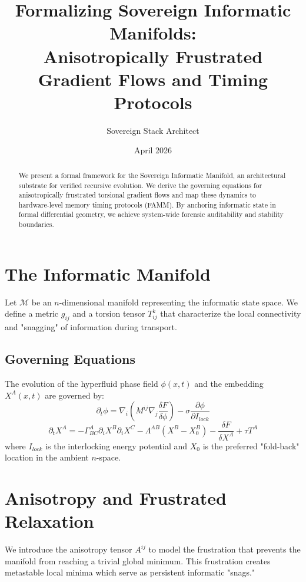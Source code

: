 \documentclass[11pt,a4paper]{article}
\title{Formalizing Sovereign Informatic Manifolds: \\ Anisotropically Frustrated Gradient Flows and Timing Protocols}
\author{Sovereign Stack Architect}
\date{April 2026}
\begin{document}
\maketitle

\begin{abstract}
We present a formal framework for the Sovereign Informatic Manifold, an architectural substrate for verified recursive evolution. We derive the governing equations for anisotropically frustrated torsional gradient flows and map these dynamics to hardware-level memory timing protocols (FAMM). By anchoring informatic state in formal differential geometry, we achieve system-wide forensic auditability and stability boundaries.
\end{abstract}

\section{The Informatic Manifold}
Let $\mathcal{M}$ be an $n$-dimensional manifold representing the informatic state space. We define a metric $g_{ij}$ and a torsion tensor $T^k_{ij}$ that characterize the local connectivity and "snagging" of information during transport.

\subsection{Governing Equations}
The evolution of the hyperfluid phase field $\phi(x,t)$ and the embedding $X^A(x,t)$ are governed by:
\begin{equation}
    \partial_t \phi = \nabla_i(M^{ij} \nabla_j \frac{\delta F}{\delta \phi}) - \sigma \frac{\partial \phi}{\partial I_{lock}}
\end{equation}
\begin{equation}
    \partial_t X^A = -\Gamma^A_{BC} \partial_i X^B \partial_i X^C - \Lambda^{AB}(X^B - X_0^B) - \frac{\delta F}{\delta X^A} + \tau T^A
\end{equation}
where $I_{lock}$ is the interlocking energy potential and $X_0$ is the preferred "fold-back" location in the ambient $n$-space.

\section{Anisotropy and Frustrated Relaxation}
We introduce the anisotropy tensor $A^{ij}$ to model the frustration that prevents the manifold from reaching a trivial global minimum. This frustration creates metastable local minima which serve as persistent informatic "snags."
\end{document}
